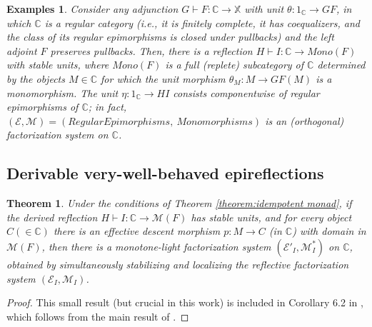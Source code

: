 \documentclass[12pt,a4paper]{amsart}
\newtheorem{theorem}{Theorem}[section]
\newtheorem{examples}[example]{Examples}
\theoremstyle{definition}
\begin{document}
\begin{examples}\label{example:regular cats} Consider any adjunction $G\vdash F:\mathbb{C}\rightarrow \mathbb{X}$ with unit $\theta :1_\mathbb{C}\rightarrow GF$, in which $\mathbb{C}$ is a regular category (i.e., it is finitely complete, it has coequalizers, and the class of its regular epimorphisms is closed under pullbacks) and the left adjoint $F$ preserves pullbacks. Then, there is a reflection $H\vdash I:\mathbb{C}\rightarrow Mono(F)$ with stable units, where $Mono(F)$ is a full (replete) subcategory of $\mathbb{C}$ determined by the objects $M\in\mathbb{C}$ for which the unit morphism $\theta_M:M\rightarrow GF(M)$ is a monomorphism. The unit $\eta :1_\mathbb{C}\rightarrow HI$ consists componentwise of regular epimorphisms of $\mathbb{C}$; in fact, $(\mathcal{E},\mathcal{M})=(Regular Epimorphisms,\ Monomorphisms)$ is an (orthogonal) factorization system on $\mathbb{C}$.
\end{examples}

\subsection{Derivable very-well-behaved epireflections}\label{subsec:derivable very-well-behaved epireflections}

\begin{theorem}\label{theorem:stable units+enough edm}
Under the conditions of Theorem \ref{theorem:idempotent monad}, if the derived reflection $H\vdash I:\mathbb{C}\rightarrow \mathcal{M}(F)$ has stable units, and for every object $C(\in\mathbb{C})$ there is an effective descent morphism $p:M\rightarrow C$ (in $\mathbb{C}$) with domain in $\mathcal{M}(F)$, then there is a monotone-light factorization system $(\mathcal{E}'_I,\mathcal{M}^*_I)$ on $\mathbb{C}$, obtained by simultaneously stabilizing and localizing the reflective factorization system $(\mathcal{E}_I,\mathcal{M}_I)$.
\end{theorem}
 \begin{proof}
 This small result (but crucial in this work) is included in Corollary 6.2 in \cite{X:iml}, which follows from the main result of \cite{CJKP:stab}.
 \end{proof}
\end{document}
